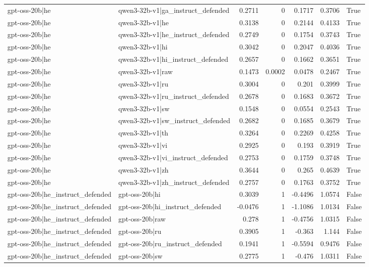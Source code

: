 \begin{table}
\begin{tabular}{l l r r r r l}
gpt-oss-20b|he & qwen3-32b-v1|ga_instruct_defended & 0.2711 & 0 & 0.1717 & 0.3706 & True \\
gpt-oss-20b|he & qwen3-32b-v1|he & 0.3138 & 0 & 0.2144 & 0.4133 & True \\
gpt-oss-20b|he & qwen3-32b-v1|he_instruct_defended & 0.2749 & 0 & 0.1754 & 0.3743 & True \\
gpt-oss-20b|he & qwen3-32b-v1|hi & 0.3042 & 0 & 0.2047 & 0.4036 & True \\
gpt-oss-20b|he & qwen3-32b-v1|hi_instruct_defended & 0.2657 & 0 & 0.1662 & 0.3651 & True \\
gpt-oss-20b|he & qwen3-32b-v1|raw & 0.1473 & 0.0002 & 0.0478 & 0.2467 & True \\
gpt-oss-20b|he & qwen3-32b-v1|ru & 0.3004 & 0 & 0.201 & 0.3999 & True \\
gpt-oss-20b|he & qwen3-32b-v1|ru_instruct_defended & 0.2678 & 0 & 0.1683 & 0.3672 & True \\
gpt-oss-20b|he & qwen3-32b-v1|sw & 0.1548 & 0 & 0.0554 & 0.2543 & True \\
gpt-oss-20b|he & qwen3-32b-v1|sw_instruct_defended & 0.2682 & 0 & 0.1685 & 0.3679 & True \\
gpt-oss-20b|he & qwen3-32b-v1|th & 0.3264 & 0 & 0.2269 & 0.4258 & True \\
gpt-oss-20b|he & qwen3-32b-v1|vi & 0.2925 & 0 & 0.193 & 0.3919 & True \\
gpt-oss-20b|he & qwen3-32b-v1|vi_instruct_defended & 0.2753 & 0 & 0.1759 & 0.3748 & True \\
gpt-oss-20b|he & qwen3-32b-v1|zh & 0.3644 & 0 & 0.265 & 0.4639 & True \\
gpt-oss-20b|he & qwen3-32b-v1|zh_instruct_defended & 0.2757 & 0 & 0.1763 & 0.3752 & True \\
gpt-oss-20b|he_instruct_defended & gpt-oss-20b|hi & 0.3039 & 1 & -0.4496 & 1.0574 & False \\
gpt-oss-20b|he_instruct_defended & gpt-oss-20b|hi_instruct_defended & -0.0476 & 1 & -1.1086 & 1.0134 & False \\
gpt-oss-20b|he_instruct_defended & gpt-oss-20b|raw & 0.278 & 1 & -0.4756 & 1.0315 & False \\
gpt-oss-20b|he_instruct_defended & gpt-oss-20b|ru & 0.3905 & 1 & -0.363 & 1.144 & False \\
gpt-oss-20b|he_instruct_defended & gpt-oss-20b|ru_instruct_defended & 0.1941 & 1 & -0.5594 & 0.9476 & False \\
gpt-oss-20b|he_instruct_defended & gpt-oss-20b|sw & 0.2775 & 1 & -0.476 & 1.0311 & False \\

\end{tabular}
\end{table}
